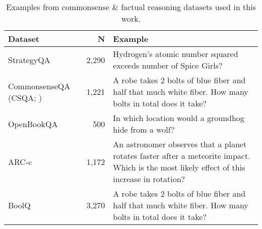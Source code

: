 \begin{table}[ht!]
\centering
\caption{Examples from commonsense \& factual reasoning datasets used in this work.}
\begin{tabular}{@{}lrp{6cm}@{}}
\toprule
Dataset   & N     & Example                                                                                            \\ 
\midrule
StrategyQA~\citep{cobbe2021gsm8k} & 2,290 & Hydrogen's atomic number squared exceeds number of Spice Girls? \\
CommonsenseQA (CSQA; \citealp{talmor2019commonsenseqa}) & 1,221 & A robe takes 2 bolts of blue fiber and half that much white fiber.  How many bolts in total does it take? \\
OpenBookQA~\citep{mihaylov2018openbookqa} & 500 & In which location would a groundhog hide from a wolf? \\
ARC-c~\citep{clark2018think} & 1,172 & An astronomer observes that a planet rotates faster after a meteorite impact. Which is the most likely effect of this increase in rotation? \\
BoolQ~\citep{clark2019boolq} & 3,270 & A robe takes 2 bolts of blue fiber and half that much white fiber.  How many bolts in total does it take? \\
\bottomrule
\end{tabular}
\label{tab:qa:examples}
\end{table}
